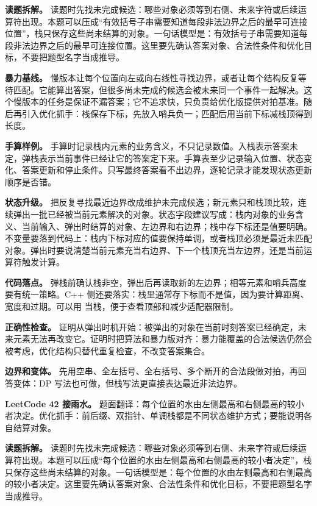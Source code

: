 \textbf{读题拆解。} 读题时先找未完成候选：哪些对象必须等到右侧、未来字符或后续运算符出现。本题可以压成“有效括号子串需要知道每段非法边界之后的最早可连接位置”，栈只保存这些尚未结算的对象。一句话模型是：有效括号子串需要知道每段非法边界之后的最早可连接位置。这里要先确认答案对象、合法性条件和优化目标，不要把题型名字当成推导。

\textbf{暴力基线。} 慢版本让每个位置向左或向右线性寻找边界，或者让每个结构反复等待匹配。它能算出答案，但很多尚未完成的候选会被未来同一个事件一起解决。这个慢版本的任务是保证不漏答案；它不追求快，只负责给优化版提供对拍基准。随后再引入优化抓手：栈保存下标，先放入哨兵负一；匹配后用当前下标减栈顶得到长度。

\textbf{手算样例。} 手算时记录栈内元素的业务含义，不只记录数值。入栈表示答案未定，弹栈表示当前事件已经让它的答案定下来。手算表至少记录输入位置、状态变化、答案更新和停止条件。只写最终答案看不出边界，逐轮记录才能发现状态更新顺序是否错。

\textbf{状态升级。} 把反复寻找最近边界改成维护未完成候选；新元素只和栈顶比较，连续弹出一批已经被当前元素解决的对象。状态字段建议写成：栈内对象的业务含义、当前输入、弹出时结算的对象、左边界和右边界；栈中存下标还是值要明确。不变量要落到代码上：栈内下标对应的值要保持单调，或者栈顶必须是最近未匹配对象。弹出时要说清楚当前元素充当右边界、下一个栈顶充当左边界，还是当前运算符触发计算。

\textbf{代码落点。} 弹栈前确认栈非空，弹出后再读取新的左边界；相等元素和哨兵高度要有统一策略。C++ 侧还要落实：栈里通常存下标而不是值，因为要计算距离、宽度和过期。可以用  当栈，便于查看顶部和减少适配器限制。

\textbf{正确性检查。} 证明从弹出时机开始：被弹出的对象在当前时刻答案已经确定，未来元素无法再改变它。证明时把算法和暴力版对齐：暴力能覆盖的合法候选仍然会被考虑，优化结构只替代重复检查，不改变答案集合。

\textbf{边界和变体。} 先用空串、全左括号、全右括号、多个断开的合法段做对拍，再回答变体：DP 写法也可做，但栈写法更直接表达最近非法边界。

\noindent\textbf{LeetCode 42 接雨水。} 题面翻译：每个位置的水由左侧最高和右侧最高的较小者决定。优化抓手：前后缀、双指针、单调栈都是不同状态维护方式；要能说明各自结算对象。

\textbf{读题拆解。} 读题时先找未完成候选：哪些对象必须等到右侧、未来字符或后续运算符出现。本题可以压成“每个位置的水由左侧最高和右侧最高的较小者决定”，栈只保存这些尚未结算的对象。一句话模型是：每个位置的水由左侧最高和右侧最高的较小者决定。这里要先确认答案对象、合法性条件和优化目标，不要把题型名字当成推导。

